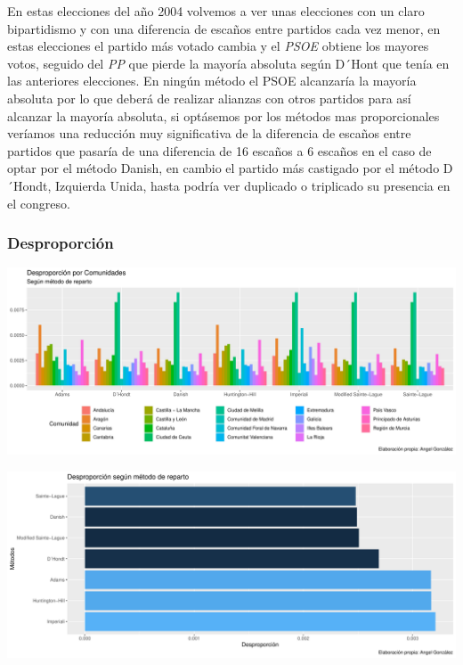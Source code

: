 \documentclass[12pt,a4paper,]{book}
\numberwithin{dummy}{section}
\theoremstyle{ocrenumbox}
\theoremstyle{blacknumex}
\theoremstyle{blacknumbox}
\theoremstyle{ocrenum}
\theoremstyle{ocrenum}
\begin{document}
En estas elecciones del año 2004 volvemos a ver unas elecciones con un
claro bipartidismo y con una diferencia de escaños entre partidos cada
vez menor, en estas elecciones el partido más votado cambia y el
\emph{PSOE} obtiene los mayores votos, seguido del \emph{PP} que pierde
la mayoría absoluta según D´Hont que tenía en las anteriores elecciones.
En ningún método el PSOE alcanzaría la mayoría absoluta por lo que
deberá de realizar alianzas con otros partidos para así alcanzar la
mayoría absoluta, si optásemos por los métodos mas proporcionales
veríamos una reducción muy significativa de la diferencia de escaños
entre partidos que pasaría de una diferencia de 16 escaños a 6 escaños
en el caso de optar por el método Danish, en cambio el partido más
castigado por el método D´Hondt, Izquierda Unida, hasta podría ver
duplicado o triplicado su presencia en el congreso.

\hypertarget{desproporciuxf3n-8}{%
\subsubsection{Desproporción}\label{desproporciuxf3n-8}}

\begin{center}\includegraphics[width=0.95\linewidth]{figurasR/unnamed-chunk-135-1} \end{center}

\begin{center}\includegraphics[width=0.95\linewidth]{figurasR/unnamed-chunk-135-2} \end{center}
\end{document}
